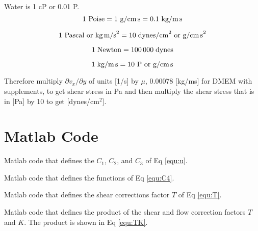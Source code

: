 Water is 1 cP or 0.01 P.
\begin{equation}
\centering
1 \textrm{ Poise} = 1 \textrm{ g/cm\,s} = 0.1\textrm{ kg/m\,s}
\end{equation}

\begin{equation}
\centering
1 \textrm{ Pascal or kg\,m/s}^{2} = 10 \;\mathrm{ dynes/cm}^{2} \textrm{ or g/cm\,s}^{2}
\end{equation}

\begin{equation}
\centering
1 \;\mathrm{ Newton} = 100\,000 \;\mathrm{ dynes}
\end{equation}

\begin{equation}
\centering
1 \;\mathrm{ kg/m\,s} = 10 \textrm{ P or g/cm\,s}
\end{equation}

Therefore multiply $\partial v_{x}/\partial y$ of units [1/s] by $\mu$, 0.00078 [kg/ms] for DMEM with supplements, to get shear stress in Pa and then multiply the shear stress that is in [Pa] by 10 to get [dynes/cm$^{2}$].

\section{Matlab Code}

\begin{matlab}
\caption{Matlab code that defines the $C_{1}$, $C_{2}$, and $C_{3}$ of Eq \ref{equ:u}.}

\end{matlab}

\begin{matlab}
\caption{Matlab code that defines the functions of Eq \ref{equ:C4}.}

\end{matlab}

\begin{matlab}
\caption{Matlab code that defines the shear corrections factor $T$ of Eq \ref{equ:T}.}

\end{matlab}

\begin{matlab}
\caption{Matlab code that defines the product of the shear and flow correction factors $T$ and $K$. The product is shown in Eq \ref{equ:TK}.}

\end{matlab}


